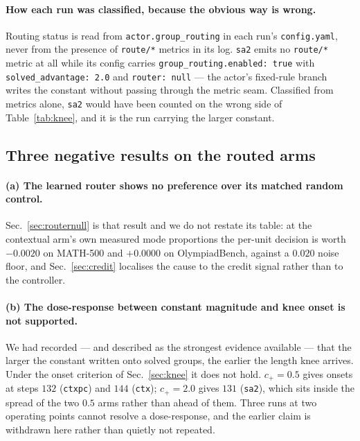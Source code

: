 \paragraph{How each run was classified, because the obvious way is wrong.} Routing status is
read from \texttt{actor.group\_routing} in each run's \texttt{config.yaml}, never from the
presence of \texttt{route/*} metrics in its log. \texttt{sa2} emits no \texttt{route/*} metric
at all while its config carries \texttt{group\_routing.enabled: true} with
\texttt{solved\_advantage: 2.0} and \texttt{router: null} --- the actor's fixed-rule branch
writes the constant without passing through the metric seam. Classified from metrics alone,
\texttt{sa2} would have been counted on the wrong side of Table~\ref{tab:knee}, and it is the
run carrying the larger constant.

\subsection{Three negative results on the routed arms}
\label{sec:routingnegatives}

\paragraph{(a) The learned router shows no preference over its matched random control.}
Sec.~\ref{sec:routernull} is that result and we do not restate its table: at the contextual
arm's own measured mode proportions the per-unit decision is worth $-0.0020$ on MATH-500 and
$+0.0000$ on OlympiadBench, against a $0.020$ noise floor, and Sec.~\ref{sec:credit} localises
the cause to the credit signal rather than to the controller.

\paragraph{(b) The dose-response between constant magnitude and knee onset is not supported.}
We had recorded --- and described as the strongest evidence available --- that the larger the
constant written onto solved groups, the earlier the length knee arrives. Under the onset
criterion of Sec.~\ref{sec:knee} it does not hold. $c_+ = 0.5$ gives onsets at steps $132$
(\texttt{ctxpc}) and $144$ (\texttt{ctx}); $c_+ = 2.0$ gives $131$ (\texttt{sa2}), which sits
inside the spread of the two $0.5$ arms rather than ahead of them. Three runs at two operating
points cannot resolve a dose-response, and the earlier claim is withdrawn here rather than
quietly not repeated.

